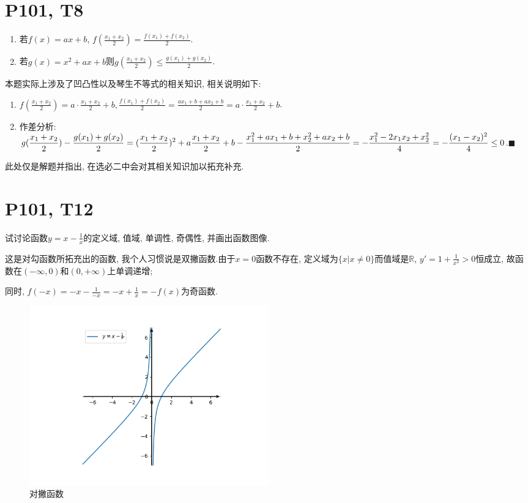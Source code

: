 \documentclass{book}
\begin{document}
    \section{\textcolor[rgb]{0.11,0.65,0.52}{P101, T8}}
    \begin{boxB}
        \begin{enumerate}
            \item 若$f(x)=ax+b$, $\displaystyle f(\frac{x_1+x_2}{2})=\frac{f(x_1)+f(x_2)}{2}$.
            \item 若$g(x)=x^2+ax+b$则$\displaystyle g(\frac{x_1+x_2}{2})\le \frac{g(x_1)+g(x_2)}{2}$.
        \end{enumerate}
    \end{boxB}
    本题实际上涉及了\textcolor[rgb]{0.38,0.11,0.2}{凹凸性}以及\textcolor[rgb]{0.38,0.11,0.2}{琴生不等式}的相关知识, 相关说明如下:
    \begin{enumerate}
        \doublespacing
        \item $\displaystyle f(\frac{x_1+x_2}{2})=a\cdot \frac{x_1+x_2}{2}+b, \frac{f(x_1)+f(x_2)}{2}=\frac{ax_1+b+ax_2+b}{2}=a\cdot \frac{x_1+x_2}{2}+b$.
        \item \textcolor[rgb]{0.75,0.17,0.22}{作差分析}: $\displaystyle g(\frac{x_1+x_2}{2})-\frac{g(x_1)+g(x_2)}{2}\\=(\frac{x_1+x_2}{2})^2+a\frac{x_1+x_2}{2}+b-\frac{x_1^2+ax_1+b+x_2^2+ax_2+b}{2}\\=-\frac{x_1^2-2x_1x_2+x_2^2}{4}=-\frac{(x_1-x_2)^2}{4}\le 0$.$\blacksquare$
    \end{enumerate}
    此处仅是解题并指出, 在选必二中会对其相关知识加以拓充补充.
    \section{\textcolor[rgb]{0.11,0.65,0.52}{P101, T12}}
    \begin{boxB}
        试讨论函数$\displaystyle y=x-\frac{1}{x}$的定义域, 值域, 单调性, 奇偶性, 并画出函数图像.
    \end{boxB}
    这是对勾函数所拓充出的函数, 我个人习惯说是双撇函数.由于$x=0$函数不存在, 定义域为$\{x|x\neq 0\}$而值域是$\mathbb{R}$, $y'=1+\frac{1}{x^2}>0$恒成立, 故函数在$(-\infty ,0)$和$(0,+\infty )$上单调递增;
        
    同时, $\displaystyle f(-x)=-x-\frac{1}{-x}=-x+\frac{1}{x}=-f(x)$为奇函数.
    \begin{figure}[htbp]
        \centering
        \includegraphics[width=0.5\textwidth]{img/sp.png}
        \caption{对撇函数}
    \end{figure}
\end{document}

